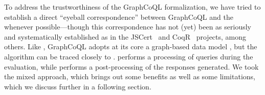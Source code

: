 


To address the trustworthiness of the GraphCoQL formalization, we have tried to establish a direct ``eyeball correspondence'' between GraphCoQL and the \spec{} whenever possible---though this correspondence has not (yet) been as seriously and systematically established as in the JSCert~\cite{jscert} and CoqR~\cite{coqr} projects, among others.
Like \HP{}, GraphCoQL adopts at its core a graph-based data model , but the algorithm  can be traced closely to \spec{}. 
\spec{} performs a processing of queries during the evaluation, while \HP{} performs a post-processing of the responses generated. We took the mixed approach, which brings out some benefits as well as some limitations, which we discuss further in a following section.



